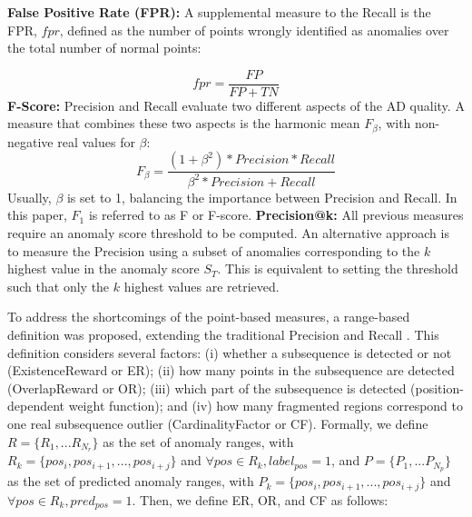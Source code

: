 \noindent \textbf{False Positive Rate (FPR): } A supplemental measure to the Recall is the FPR, $fpr$, defined as the number of points wrongly identified as anomalies over the total number of normal points:

\begin{equation}
fpr = \frac{FP}{FP+TN}
\end{equation}
\newline \textbf{F-Score: } Precision and Recall evaluate two different aspects of the AD quality. A measure that combines these two aspects is the harmonic mean $F_{\beta}$, with non-negative real values for $\beta$:
\begin{equation}
F_{\beta} = \frac{(1+\beta^2)*Precision*Recall}{\beta^2*Precision+Recall}
\end{equation}
\noindent Usually, $\beta$ is set to 1, balancing the importance between Precision and Recall. In this paper, $F_1$ is referred to as F or F-score.
\newline \textbf{Precision@k: } All previous measures require an anomaly score threshold to be computed. An alternative approach is to measure the Precision using a subset of anomalies corresponding to the $k$ highest value in the anomaly score $S_T$. This is equivalent to setting the threshold such that only the $k$ highest values are retrieved. 

To address the shortcomings of the point-based measures, a range-based definition was proposed, extending the traditional Precision and Recall \cite{tatbul_precision_2018}. This definition considers several factors: (i) whether a subsequence is detected or not (ExistenceReward or ER); (ii) how many points in the subsequence are detected (OverlapReward or OR); (iii) which part of the subsequence is detected (position-dependent weight function); and (iv) how many fragmented regions correspond to one real subsequence outlier (CardinalityFactor or CF). Formally, we define $R=\{R_1,...R_{N_r}\}$ as the set of anomaly ranges, with $R_k=\{pos_i,pos_{i+1}, ..., pos_{i+j}\}$ and $\forall pos \in R_k, label_{pos} = 1$, and $P=\{P_1,...P_{N_p}\}$ as the set of predicted anomaly ranges, with $P_k=\{pos_i,pos_{i+1}, ..., pos_{i+j}\}$ and $\forall pos \in R_k, pred_{pos} = 1$. Then, we define ER, OR, and CF as follows:


